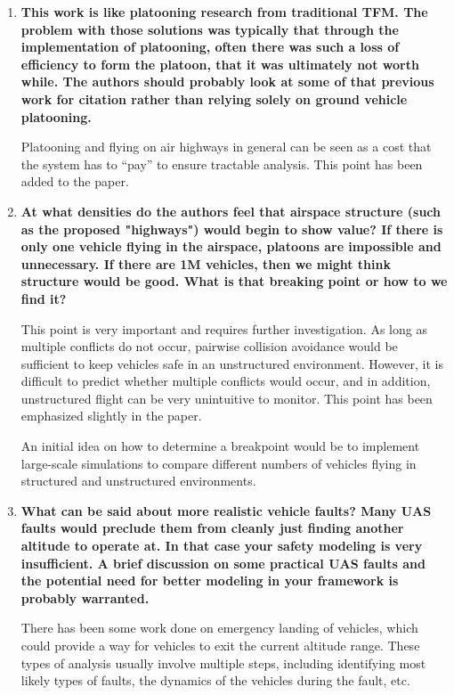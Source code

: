 \documentclass[submit]{aiaa-pretty}
\begin{document}
\begin{enumerate}
\item\textbf{This work is like platooning research from traditional TFM.  The problem with those solutions was typically that through the implementation of platooning, often there was such a loss of efficiency to form the platoon, that it was ultimately not worth while.  The authors should probably look at some of that previous work for citation rather than relying solely on ground vehicle platooning.}

Platooning and flying on air highways in general can be seen as a cost that the system has to ``pay'' to ensure tractable analysis. This point has been added to the paper.

\item\textbf{At what densities do the authors feel that airspace structure (such as the proposed "highways") would begin to show value?  If there is only one vehicle flying in the airspace, platoons are impossible and unnecessary.  If there are 1M vehicles, then we might think structure would be good.  What is that breaking point or how to we find it?}

This point is very important and requires further investigation. As long as multiple conflicts do not occur, pairwise collision avoidance would be sufficient to keep vehicles safe in an unstructured environment. However, it is difficult to predict whether multiple conflicts would occur, and in addition, unstructured flight can be very unintuitive to monitor. This point has been emphasized slightly in the paper.

An initial idea on how to determine a breakpoint would be to implement large-scale simulations to compare different numbers of vehicles flying in structured and unstructured environments. 

\item\textbf{What can be said about more realistic vehicle faults?  Many UAS faults would preclude them from cleanly just finding another altitude to operate at.  In that case your safety modeling is very insufficient.  A brief discussion on some practical UAS faults and the potential need for better modeling in your framework is probably warranted.}

There has been some work done on emergency landing of vehicles, which could provide a way for vehicles to exit the current altitude range. These types of analysis usually involve multiple steps, including identifying most likely types of faults, the dynamics of the vehicles during the fault, etc. 


\end{enumerate}
\end{document}
